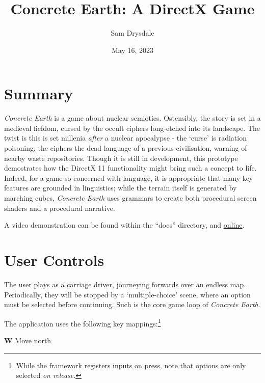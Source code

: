\documentclass[a4paper, 11pt]{article}
\title{Concrete Earth: A DirectX Game}
\author{Sam Drysdale}
\date{May 16, 2023}
\begin{document}
\graphicspath{{./Images/}}
\maketitle
\tableofcontents
\begin{flushleft}

\section{Summary}

\textit{Concrete Earth} is a game about nuclear semiotics. Ostensibly, the story is set in a medieval fiefdom, cursed by the occult ciphers long-etched into its landscape. The twist is this is set millenia \textit{after} a nuclear apocalypse - the `curse' is radiation poisoning, the ciphers the dead language of a previous civilisation, warning of nearby waste repositories. Though it is still in development, this prototype demostrates how the DirectX 11 functionality might bring such a concept to life. Indeed, for a game so concerned with language, it is appropriate that many key features are grounded in linguistics; while the terrain itself is generated by marching cubes, \textit{Concrete Earth} uses grammars to create both procedural screen shaders and a procedural narrative.

\vspace{5pt}\noindent
A video demonstration can be found within the ``docs'' directory, and \href{https://www.youtube.com/watch?v=FbqZv7QruQ4&feature=youtu.be}{\ul{online}}. 

\newpage
\section{User Controls}

The user plays as a carriage driver, journeying forwards over an endless map. Periodically, they will be stopped by a `multiple-choice' scene, where an option must be selected before continuing. Such is the core game loop of \textit{Concrete Earth}.

\vspace{5pt}\noindent
The application uses the following key mappings:\footnote{While the framework registers inputs on press, note that options are only selected \textit{on release}.}

\begin{center}
\parbox[t]{0.75\textwidth}{
\vspace{0pt}\noindent 
\textbf{W} \dotfill{} Move north

}
\end{center}
\end{flushleft}
\end{document}
